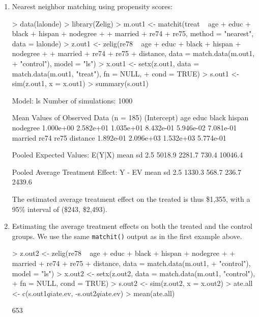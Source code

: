 \begin{enumerate}
\item Nearest neighbor matching using propensity scores: 

\begin{Schunk}
\begin{Sinput}
> data(lalonde)
> library(Zelig)
> m.out1 <- matchit(treat ~ age + educ + black + hispan + nodegree + 
+     married + re74 + re75, method = "nearest", data = lalonde)
> z.out1 <- zelig(re78 ~ age + educ + black + hispan + nodegree + 
+     married + re74 + re75 + distance, data = match.data(m.out1, 
+     "control"), model = "ls")
> x.out1 <- setx(z.out1, data = match.data(m.out1, "treat"), fn = NULL, 
+     cond = TRUE)
> s.out1 <- sim(z.out1, x = x.out1)
> summary(s.out1)
\end{Sinput}
\begin{Soutput}

  Model: ls 
  Number of simulations: 1000 

Mean Values of Observed Data (n = 185) 
(Intercept)         age        educ       black      hispan    nodegree 
  1.000e+00   2.582e+01   1.035e+01   8.432e-01   5.946e-02   7.081e-01 
    married        re74        re75    distance 
  1.892e-01   2.096e+03   1.532e+03   5.774e-01 

Pooled Expected Values: E(Y|X)
   mean      sd    2.5%   97.5% 
 5018.9  2281.7   730.4 10046.4 

Pooled Average Treatment Effect: Y - EV
  mean     sd   2.5%  97.5% 
1330.3  568.7  236.7 2439.6 

\end{Soutput}
\end{Schunk}
  
The estimated average treatment effect on the treated is thus \$1,355, with a 95\% interval
of (\$243, \$2,493).

\item Estimating the average treatment effects on both the treated and
  the control groups. We use the same {\tt matchit()} output as in the
  first example above.

\begin{Schunk}
\begin{Sinput}
> z.out2 <- zelig(re78 ~ age + educ + black + hispan + nodegree + 
+     married + re74 + re75 + distance, data = match.data(m.out1, 
+     "control"), model = "ls")
> x.out2 <- setx(z.out2, data = match.data(m.out1, "control"), 
+     fn = NULL, cond = TRUE)
> s.out2 <- sim(z.out2, x = x.out2)
> ate.all <- c(s.out1$qi$ate.ev, -s.out2$qi$ate.ev)
> mean(ate.all)
\end{Sinput}
\begin{Soutput}
[1] 653


\end{Soutput}
\end{Schunk}
\end{enumerate}
